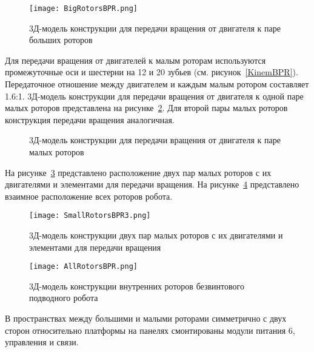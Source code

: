 \begin{figure}[h]
	\centering
	\texttt{[image: BigRotorsBPR.png]}%
	\caption{3Д-модель конструкции для передачи вращения от двигателя к паре больших роторов}
	\label{BigRotorsBPR}
\end{figure}

Для передачи вращения от двигателей к малым роторам используются промежуточные оси и шестерни на 12 и 20 зубьев (см. рисунок~\ref{KinemBPR}). Передаточное отношение между двигателем и каждым малым ротором составляет 1.6:1. 3Д-модель конструкции для передачи вращения от двигателя к одной паре малых роторов представлена на рисунке~\ref{SmallRotorsBPR}. Для второй пары малых роторов конструкция передачи вращения аналогичная.

\begin{figure}[!ht]
	\begin{minipage}[h]{0.5\linewidth}
	\end{minipage}
	\hfill
	\begin{minipage}[h]{0.5\linewidth}
	\end{minipage}
	\caption{3Д-модель конструкции для передачи вращения от двигателя к паре малых роторов}
	\label{SmallRotorsBPR}
\end{figure}

На рисунке~\ref{SmallRotorsBPR3} представлено расположение двух пар малых роторов с их двигателями и элементами для передачи вращения. На рисунке~\ref{AllRotorsBPR} представлено взаимное расположение всех роторов робота.

\begin{figure}[h]
	\centering
	\texttt{[image: SmallRotorsBPR3.png]}%
	\caption{3Д-модель конструкции двух пар малых роторов с их двигателями и элементами для передачи вращения}
	\label{SmallRotorsBPR3}
\end{figure}

\begin{figure}[h]
	\centering
	\texttt{[image: AllRotorsBPR.png]}%
	\caption{3Д-модель конструкции внутренних роторов безвинтового подводного робота}
	\label{AllRotorsBPR}
\end{figure}



В пространствах между большими и малыми роторами симметрично с двух сторон относительно платформы на панелях смонтированы модули питания 6, управления и связи.

